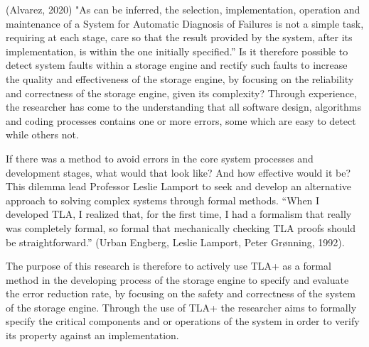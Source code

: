 \documentclass[11pt,a4paper,oneside]{book} %
\numberwithin{equation}{section}
\begin{document}



(Alvarez, 2020) "As can be inferred, the selection, implementation, operation and
maintenance of a System for Automatic Diagnosis of Failures is not a simple task, requiring at
each stage, care so that the result provided by the system, after its implementation, is within
the one initially specified.” Is it therefore possible to detect system faults within a storage
engine and rectify such faults to increase the quality and effectiveness of the storage engine,
by focusing on the reliability and correctness of the storage engine, given its complexity?
Through experience, the researcher has come to the understanding that all software design, algorithms and
coding processes contains one or more errors, some which are easy to detect while others not.

\setlength{\parskip}{10pt}

If there was a method to avoid errors in the core system processes and development stages,
what would that look like? And how effective would it be? This dilemma lead Professor Leslie
Lamport to seek and develop an alternative approach to solving complex systems through
formal methods. “When I developed TLA, I realized that, for the first time, I had a formalism
that really was completely formal, so formal that mechanically checking TLA proofs should be
straightforward.” (Urban Engberg, Leslie Lamport, Peter Grønning, 1992).

\setlength{\parskip}{10pt}

The purpose of this research is therefore to actively use TLA+ as a formal method in the
developing process of the storage engine to specify and evaluate the error reduction rate, by
focusing on the safety and correctness of the system of the storage engine. Through the use
of TLA+ the researcher aims to formally specify the critical components and or operations of
the system in order to verify its property against an implementation.
\end{document}
